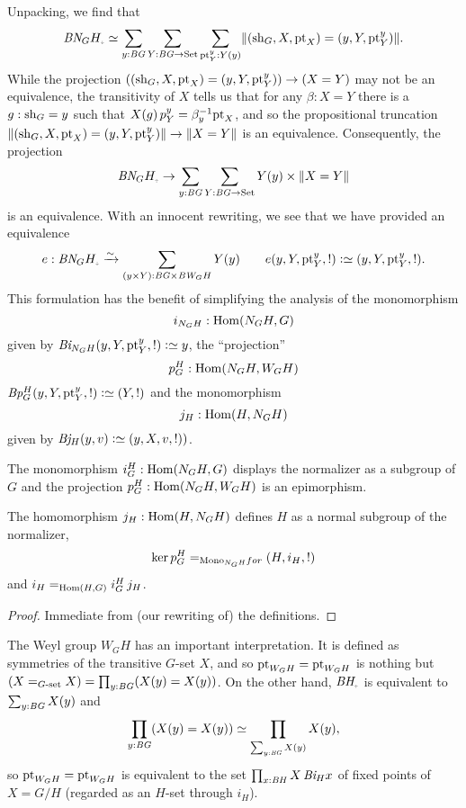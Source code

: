 Unpacking, we find that
$$\BN_GH_\div\oldequiv \sum_{y:\BG}\sum_{Y:\BG\to\Set}\sum_{\pt^y_Y:Y(y)} \Trunc{(\sh_G,X,\pt_X)=(y,Y,\pt^y_Y)}.$$
While the projection $((\mathrm{sh}_G,X,\mathrm{pt}_X)=(y,Y,\mathrm{pt}^y_Y))\to (X=Y)$ may not be an equivalence, the transitivity of $X$ tells us that for any $\beta:X=Y$ there is a $g:\mathrm{sh}_G=y$ such that $X(g)\,p^y_Y=\beta^{-1}_y\mathrm{pt}_X$, and so the propositional truncation $\lVert(\mathrm{sh}_G,X,\mathrm{pt}_X)=(y,Y,\mathrm{pt}^y_Y)\rVert \to \lVert X=Y\rVert$ is an equivalence.
Consequently, the projection
$$\BN_GH_\div\to \sum_{y:\BG}\sum_{Y:\BG\to\Set}Y(y)\times\Trunc{X=Y}$$
is an equivalence.  With an innocent rewriting, we see that we have provided an equivalence
$$e:\BN_GH_\div\we\sum_{(y\times Y):\BG\times \BW_GH}Y(y)\qquad e(y,Y,\pt^y_Y,!)\defequi (y,Y,\pt^y_Y,!).$$
This formulation has the benefit of simplifying the analysis of the monomorphism
$$i_{N_GH}:\Hom(N_GH,G)$$
given by $\Bi_{N_GH}(y,Y,\pt^y_Y,!)\defequi y$, the ``projection''
 $$p_G^H:\Hom(N_GH,W_GH)$$
$\Bp_G^H(y,Y,\pt^y_Y,!)\defequi (Y,!)$ and the monomorphism
$$j_H:\Hom(H,N_GH)$$
given by $\Bj_H(y,v)\defequi(y,X,v,!))$.




\begin{lemma}
  The monomorphism $i_G^H:\Hom(N_GH,G)$ displays the normalizer as a subgroup of $G$ and the projection $p_G^H:\Hom(N_GH,W_GH)$ is an epimorphism.

The homomorphism $j_H:\Hom(H,N_GH)$ defines $H$ as a normal subgroup of the normalizer,
$$\ker p_G^H=_{\typemono_{N_GH}for}(H,i_H,!)$$
and $i_H=_{\Hom(H,G)}i_G^H\,j_H$.
\end{lemma}
\begin{proof}
  Immediate from (our rewriting of) the definitions.
\end{proof}

The Weyl group $W_GH$ has an important interpretation.  It is defined as symmetries of the transitive $G$-set $X$, and so $\mathrm{pt}_{W_GH}=\mathrm{pt}_{W_GH}$ is nothing but $(X=_{G\text{-set}}X)=\prod_{y:\mathit{B}\mathit{G}}(X(y)=X(y))$.  On the other hand, $\BH_\div$ is equivalent to $\sum_{y:\mathit{B}\mathit{G}}X(y)$ and
$$\prod_{y:\mathit{B}\mathit{G}}(X(y)=X(y))\simeq \prod_{\sum_{y:\mathit{B}\mathit{G}}X(y)}X(y),$$ so $\mathrm{pt}_{W_GH}=\mathrm{pt}_{W_GH}$ is equivalent to the set $%
\prod_{x:\BH}X\, \Bi_Hx$ of fixed points of $X=G/H$ (regarded as an $H$-set through $i_H$).

